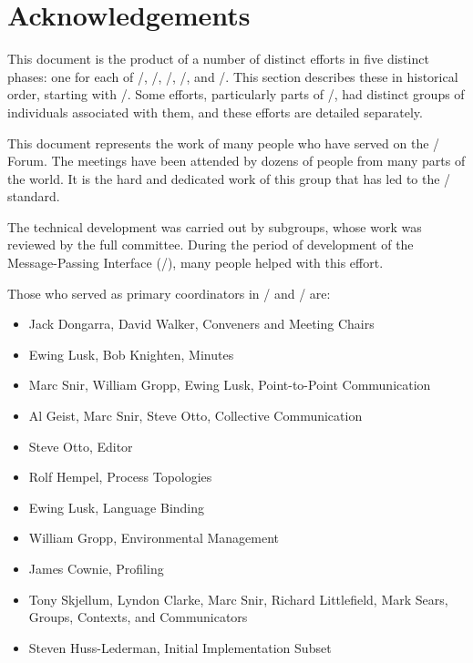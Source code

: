 
%


\chapter*{Acknowledgements}

This document is the product of a number of
  distinct efforts in five distinct phases: one for each of \MPII/,
  \MPIII/, \MPIIII/, \MPIIV/, and \MPIV/.
  This section describes these in historical
  order, starting with \MPII/.  Some efforts, particularly parts of
  \MPIII/, had distinct groups of individuals associated with them,
  and these efforts are detailed separately.

\vspace{0.5in}

This document represents the work of many people who have served on
the \MPI/ Forum.  The meetings have been attended by dozens of people
from many parts of the world.  It is the hard and dedicated work of
this group that has led to the \MPI/ standard.

The technical development was carried out by subgroups, whose work was
reviewed by the full committee.  During the period of development of
the Message-Passing Interface (\MPI/), many people helped with this
effort.  

Those who served as primary coordinators in \mpiidoto/ and \mpiidoti/ are:

\begin{itemize}
\item Jack Dongarra, David Walker, Conveners and Meeting Chairs
\item Ewing Lusk, Bob Knighten, Minutes
\item Marc Snir, William Gropp, Ewing Lusk, Point-to-Point Communication
\item Al Geist, Marc Snir, Steve Otto, Collective Communication
\item Steve Otto, Editor
\item Rolf Hempel, Process Topologies
\item Ewing Lusk, Language Binding
\item William Gropp, Environmental Management
\item James Cownie, Profiling
\item Tony Skjellum, Lyndon Clarke, Marc Snir, Richard Littlefield, Mark Sears, 
Groups, Contexts, and Communicators 
\item Steven Huss-Lederman, Initial Implementation Subset
\end{itemize}

